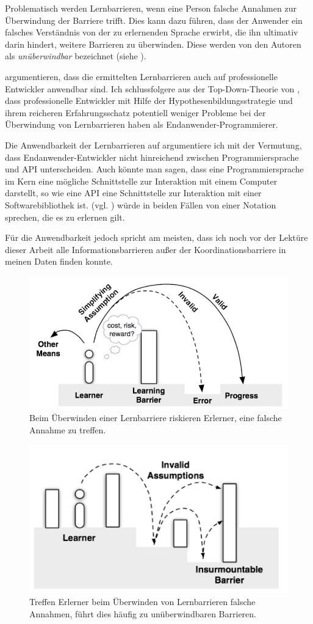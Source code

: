Problematisch werden Lernbarrieren, wenn eine Person falsche Annahmen zur Überwindung der Barriere trifft. Dies kann dazu führen, dass der Anwender ein falsches Verständnis von der zu erlernenden Sprache erwirbt, die ihn ultimativ darin hindert, weitere Barrieren zu überwinden. Diese werden von den Autoren als \textit{unüberwindbar} bezeichnet (siehe ).

\cite{AndrewJKo:2004df} argumentieren, dass die ermittelten Lernbarrieren auch auf professionelle Entwickler anwendbar sind. Ich schlussfolgere aus der Top-Down-Theorie von \cite{Brooks:1983fj}, dass professionelle Entwickler mit Hilfe der Hypothesenbildungsstrategie und ihrem reicheren Erfahrungsschatz potentiell weniger Probleme bei der Überwindung von Lernbarrieren haben als Endanwender-Programmierer.

Die Anwendbarkeit der Lernbarrieren auf  argumentiere ich mit der Vermutung, dass Endanwender-Entwickler nicht hinreichend zwischen Programmiersprache und API unterscheiden. Auch könnte man sagen, dass eine Programmiersprache im Kern eine mögliche Schnittstelle zur Interaktion mit einem Computer darstellt, so wie eine API eine Schnittstelle zur Interaktion mit einer Softwarebibliothek ist. \cite{Green:1989wb} (vgl. ) würde in beiden Fällen von einer Notation sprechen, die es zu erlernen gilt.

Für die Anwendbarkeit jedoch spricht am meisten, dass ich noch vor der Lektüre dieser Arbeit alle Informationsbarrieren außer der Koordinationsbarriere in meinen Daten finden konnte.

\begin{figure}
  \centering
    \includegraphics[width=0.55\linewidth]{Figures/learningbarriers1.png}
  \caption[Lernbarriere --- Treffen einer Annahme]{Beim Überwinden einer Lernbarriere riskieren Erlerner, eine falsche Annahme zu treffen.}
  \label{fig:learningbarriers1}
\end{figure} 

\begin{figure}
  \centering
    \includegraphics[width=0.45\linewidth]{Figures/learningbarriers2.png}
  \caption[Lernbarriere --- Unüberwindbare Barrieren]{Treffen Erlerner beim Überwinden von Lernbarrieren falsche Annahmen, führt dies häufig zu unüberwindbaren Barrieren.}
  \label{fig:learningbarriers2}
\end{figure} 



